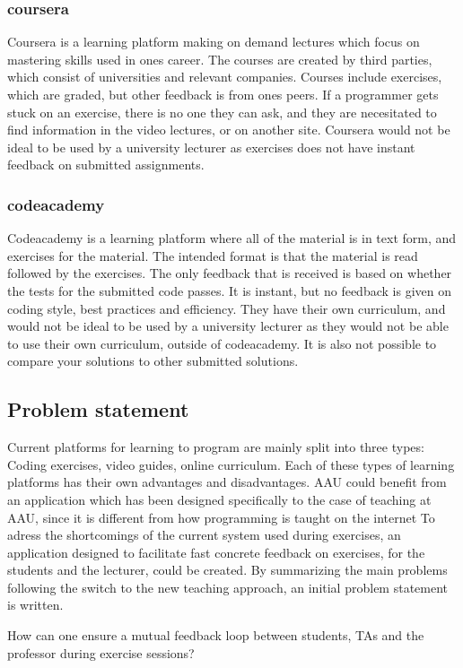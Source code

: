 \subsubsection*{coursera}
Coursera is a learning platform making on demand lectures which focus on mastering skills used in ones career. 
The courses are created by third parties, which consist of universities and relevant companies. 
Courses include exercises, which are graded, but other feedback is from ones peers. If a programmer gets stuck on an exercise, there is no one they can ask, and they are necesitated to find information in the video lectures, or on another site.
Coursera would not be ideal to be used by a university lecturer as exercises does not have instant feedback on submitted assignments.

\subsubsection*{codeacademy}
Codeacademy is a learning platform where all of the material is in text form, and exercises for the material. The intended format is that the material is read followed by the exercises. The only feedback that is received is based on whether the tests for the submitted code passes. It is instant, but no feedback is given on coding style, best practices and efficiency. 
They have their own curriculum, and would not be ideal to be used by a university lecturer as they would not be able to use their own curriculum, outside of codeacademy. It is also not possible to compare your solutions to other submitted solutions.

\subsection{Problem statement}
    
Current platforms for learning to program are mainly split into three types: Coding exercises, video guides, online curriculum. 
Each of these types of learning platforms has their own advantages and disadvantages. AAU could benefit from an application which has been designed specifically to the case of teaching at AAU, since it is different from how programming is taught on the internet
To adress the shortcomings of the current system used during exercises, an application designed to facilitate fast concrete feedback on exercises, for the students and the lecturer, could be created.
By summarizing the main problems following the switch to the new teaching approach, an initial problem statement is written.
\begin{displayquote}
How can one ensure a mutual feedback loop between students, TAs and the professor during exercise sessions?
\end{displayquote} 

